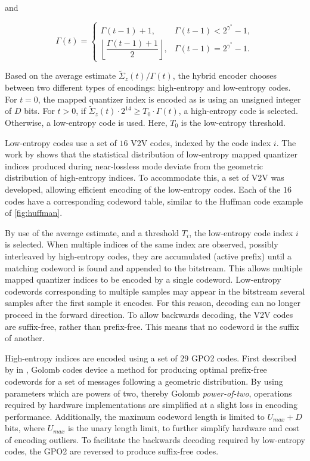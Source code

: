 and

\begin{equation}
	\Gamma(t) =
	\begin{cases}
		\Gamma(t-1) + 1,                                       & \Gamma(t-1) < 2^{\gamma^*} - 1, \\
		\left\lfloor \dfrac{\Gamma(t-1) + 1}{2} \right\rfloor, & \Gamma(t-1) = 2^{\gamma^*} - 1.
	\end{cases}
	\label{eq:counter}
\end{equation}

Based on the average estimate $\tilde{\Sigma}_z(t) / \Gamma(t)$, the hybrid encoder chooses between two different types of encodings: high-entropy and low-entropy codes. For $t=0$, the mapped quantizer index is encoded as is using an unsigned integer of $D$ bits. For $t>0$, if $\tilde{\Sigma}_z(t) \cdot 2^{14} \ge T_0 \cdot \Gamma(t)$, a high-entropy code is selected. Otherwise, a low-entropy code is used. Here, $T_0$ is the low-entropy threshold.

Low-entropy codes use a set of $16$ \acrshort{V2V} codes, indexed by the code index $i$. The work by \citeauthor{blanesHYBRIDENTROPYENCODER} shows that the statistical distribution of low-entropy mapped quantizer indices produced during near-lossless mode deviate from the geometric distribution of high-entropy indices. To accommodate this, a set of \acrshort{V2V} was developed, allowing efficient encoding of the low-entropy codes. Each of the $16$ codes have a corresponding codeword table, similar to the Huffman code example of \autoref{fig:huffman}.

By use of the average estimate, and a threshold $T_i$, the low-entropy code index $i$ is selected. When multiple indices of the same index are observed, possibly interleaved by high-entropy codes, they are accumulated (active prefix) until a matching codeword is found and appended to the bitstream. This allows multiple mapped quantizer indices to be encoded by a single codeword. Low-entropy codewords corresponding to multiple samples may appear in the bitstream several samples after the first sample it encodes. For this reason, decoding can no longer proceed in the forward direction. To allow backwards decoding, the \acrshort{V2V} codes are suffix-free, rather than prefix-free. This means that no codeword is the suffix of another.

High-entropy indices are encoded using a set of $29$ \acrfull{GPO2} codes. First described by \citeauthor{golombRunlengthEncodingsCorresp1966} in \cite{golombRunlengthEncodingsCorresp1966}, Golomb codes device a method for producing optimal prefix-free codewords for a set of messages following a geometric distribution. By using parameters which are powers of two, thereby Golomb \textit{power-of-two}, operations required by hardware implementations are simplified at a slight loss in encoding performance. Additionally, the maximum codeword length is limited to $U_{max} + D$ bits, where $U_{max}$ is the unary length limit, to further simplify hardware and cost of encoding outliers. To facilitate the backwards decoding required by low-entropy codes, the \acrshort{GPO2} are reversed to produce suffix-free codes.

